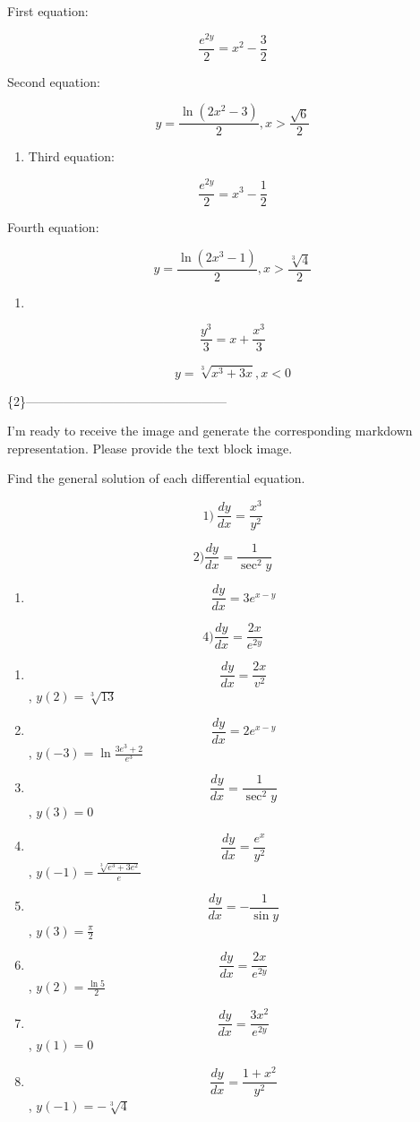 \documentclass[
]{article}
\providecommand{\tightlist}{%
  \setlength{\itemsep}{0pt}\setlength{\parskip}{0pt}}
\begin{document}
First equation:

\[\frac{e^{2y}}{2} = x^2 - \frac{3}{2}\]

Second equation:

\[y = \frac{\ln(2x^2 - 3)}{2}, x > \frac{\sqrt{6}}{2}\]

\begin{enumerate}
\def\labelenumi{\arabic{enumi})}
\setcounter{enumi}{10}
\tightlist
\item
  Third equation:
\end{enumerate}

\[\frac{e^{2y}}{2} = x^3 - \frac{1}{2}\]

Fourth equation:

\[y = \frac{\ln(2x^3 - 1)}{2}, x > \frac{\sqrt[3]{4}}{2}\]

\begin{enumerate}
\def\labelenumi{\arabic{enumi})}
\setcounter{enumi}{11}
\tightlist
\item
\end{enumerate}

\[\frac{y^3}{3} = x + \frac{x^3}{3}\]

\[y = \sqrt[3]{x^3 + 3x}, x < 0\]

\{2\}------------------------------------------------

I'm ready to receive the image and generate the corresponding markdown
representation. Please provide the text block image.

Find the general solution of each differential equation.

\[1) \ \frac{dy}{dx} = \frac{x^3}{y^2}\]

\[2) \frac{dy}{dx} = \frac{1}{\sec^2 y}\]

\begin{enumerate}
\def\labelenumi{\arabic{enumi})}
\setcounter{enumi}{2}
\tightlist
\item
  \[\frac{dy}{dx} = 3e^{x-y}\]
\end{enumerate}

\[4) \frac{dy}{dx} = \frac{2x}{e^{2y}}\]

\begin{enumerate}
\def\labelenumi{\arabic{enumi})}
\setcounter{enumi}{4}
\item
  \[\frac{dy}{dx} = \frac{2x}{v^2}\] , \(y(2) = \sqrt[3]{13}\)
\item
  \[\frac{dy}{dx} = 2e^{x-y}\] , \(y(-3) = \ln \frac{3e^3 + 2}{e^3}\)
\item
  \[\frac{dy}{dx} = \frac{1}{\sec^2 y}\] , \(y(3) = 0\)
\item
  \[\frac{dy}{dx} = \frac{e^x}{y^2}\] ,
  \(y(-1) = \frac{\sqrt[3]{e^3 + 3e^2}}{e}\)
\item
  \[\frac{dy}{dx} = -\frac{1}{\sin y}\] , \(y(3) = \frac{\pi}{2}\)
\item
  \[\frac{dy}{dx} = \frac{2x}{e^{2y}}\] , \(y(2) = \frac{\ln 5}{2}\)
\item
  \[\frac{dy}{dx} = \frac{3x^2}{e^{2y}}\] , \(y(1) = 0\)
\item
  \[\frac{dy}{dx} = \frac{1+x^2}{y^2}\] , \(y(-1) = -\sqrt[3]{4}\)
\end{enumerate}
\end{document}
